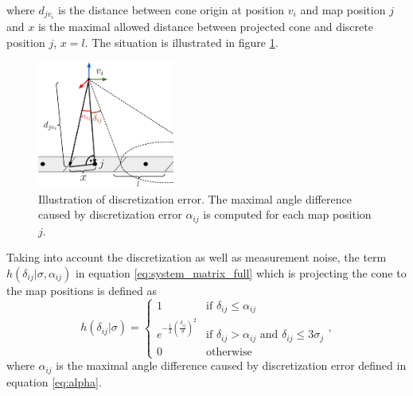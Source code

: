 where $d_{jv_{i}}$ is the distance between cone origin at position $v_{i}$ and map position $j$ and $x$ is the maximal allowed distance between projected cone and discrete position $j$, $x = l$.
The situation is illustrated in figure \ref{fig:discret}.

\begin{figure}
  \centering
\includegraphics[width=0.4\textwidth]{./fig/photos/discret.eps}
  \caption{Illustration of discretization error. The maximal angle difference caused by discretization error $\alpha_{ij}$ is computed for each map position $j$.}
  \label{fig:discret}
\end{figure}

Taking into account the discretization as well as measurement noise, the term $h(\delta_{ij}|\sigma, \alpha_{ij})$ in equation \ref{eq:system_matrix_full} which is projecting the cone to the map positions is defined as
\begin{equation}
h(\delta_{ij}|\sigma) =
\begin{cases}
1 & \text{if $\delta_{ij}\leq \alpha_{ij}$}\\ 
e^{- \frac{1}{2}(\frac{\delta_{ij}}{\sigma})^{2}} & \text{if $\delta_{ij} > \alpha_{ij}$ and  $\delta_{ij} \leq 3\sigma_{j}$} \\
0 & \text{otherwise}
\end{cases}, 
\end{equation}
where $\alpha_{ij}$ is the maximal angle difference caused by discretization error defined in equation \ref{eq:alpha}.





